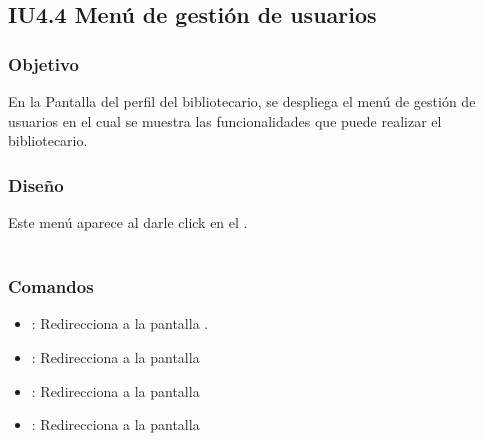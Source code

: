 \newpage
\subsection{IU4.4 Menú de gestión de usuarios}

\subsubsection{Objetivo}
	En la Pantalla del perfil del bibliotecario, se despliega el menú de gestión de usuarios en el cual se muestra las funcionalidades que puede realizar el bibliotecario.  

\subsubsection{Diseño}
	Este menú aparece al darle click en el .  \\\\


\subsubsection{Comandos}
\begin{itemize}
	\item {}: Redirecciona a la pantalla .
	\item {}: Redirecciona a la pantalla 
	\item {}: Redirecciona a la pantalla 
	\item {}: Redirecciona a la pantalla 
\end{itemize}











